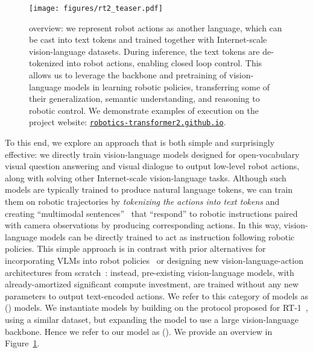 \begin{figure}[t!]
    \centering
    \texttt{[image: figures/rt2\_teaser.pdf]}
    \caption{
\methodname overview: we represent robot actions as another language, which can be cast into text tokens and trained together with Internet-scale vision-language datasets. 
During inference, the text tokens are de-tokenized into robot actions, enabling closed loop control.
This allows us to leverage the backbone and pretraining of vision-language models in learning robotic policies, transferring some of their generalization, semantic understanding, and reasoning to robotic control. 
We demonstrate examples of \methodname execution on the project website: \texttt{\href{https://robotics-transformer2.github.io/}{robotics-transformer2.github.io}}.}
\vspace{-0.2cm}
    \label{fig:teaser}
\end{figure}
\vspace{-0.1cm}

To this end, we explore an approach that is both simple and surprisingly effective: we directly train vision-language models designed for open-vocabulary visual question answering and visual dialogue to output low-level robot actions, along with solving other Internet-scale vision-language tasks. Although such models are typically trained to produce natural language tokens, we can train them on robotic trajectories by {\em{tokenizing the actions into text tokens}} and creating ``multimodal sentences''~\citep{driess2023palm} that ``respond'' to robotic instructions paired with camera observations by producing corresponding actions. 
In this way, vision-language models can be directly trained to act as instruction following robotic policies. This simple approach is in contrast with prior alternatives for incorporating VLMs into robot policies~\citep{shridhar2022cliport} or designing new vision-language-action architectures from scratch~\citep{reed2022generalist}: instead, pre-existing vision-language models, with already-amortized significant compute investment, are trained without any new parameters to output text-encoded actions. We refer to this category of models as \categoryfullname (\categoryname) models.
We instantiate \categoryname models by building on the protocol proposed for RT-1~\citep{brohan2022rt}, using a similar dataset, but expanding the model to use a large vision-language backbone. Hence we refer to our model as \methodname (\methodfullname). We provide an overview in Figure~\ref{fig:teaser}.

